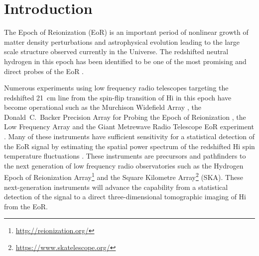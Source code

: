 \documentclass[preprint2,iop,numberedappendix,twocolappendix,appendixfloats]{emulateapj}
\begin{document}

\section{Introduction}\label{intro}


The Epoch of Reionization (EoR) is an important period of nonlinear growth of matter density perturbations and astrophysical evolution leading to the large scale structure observed currently in the Universe. The redshifted neutral hydrogen in this epoch has been identified to be one of the most promising and direct probes of the EoR \citep{sun72,sco90,mad97,toz00,ili02}. 

Numerous experiments using low frequency radio telescopes targeting the redshifted 21~cm line from the spin-flip transition of H{\sc i} in this epoch have become operational such as the Murchison Widefield Array \citep[MWA;][]{lon09,bow13,tin13}, the Donald~C.~Backer Precision Array for Probing the Epoch of Reionization \citep[PAPER;][]{par10}, the Low Frequency Array \citep[LOFAR;][]{van13} and the Giant Metrewave Radio Telescope EoR experiment \citep[GMRT;][]{pac13}. Many of these instruments have sufficient sensitivity for a statistical detection of the EoR signal by estimating the spatial power spectrum of the redshifted H{\sc i} spin temperature fluctuations \citep{bea13,thy13}. These instruments are precursors and pathfinders to the next generation of low frequency radio observatories such as the Hydrogen Epoch of Reionization Array\footnote{\url{http://reionization.org/}} \citep[HERA;][]{deb16} and the Square Kilometre Array\footnote{\url{https://www.skatelescope.org/}} (SKA). These next-generation instruments will advance the capability from a statistical detection of the signal to a direct three-dimensional tomographic imaging of H{\sc i} from the EoR. 
\end{document}
